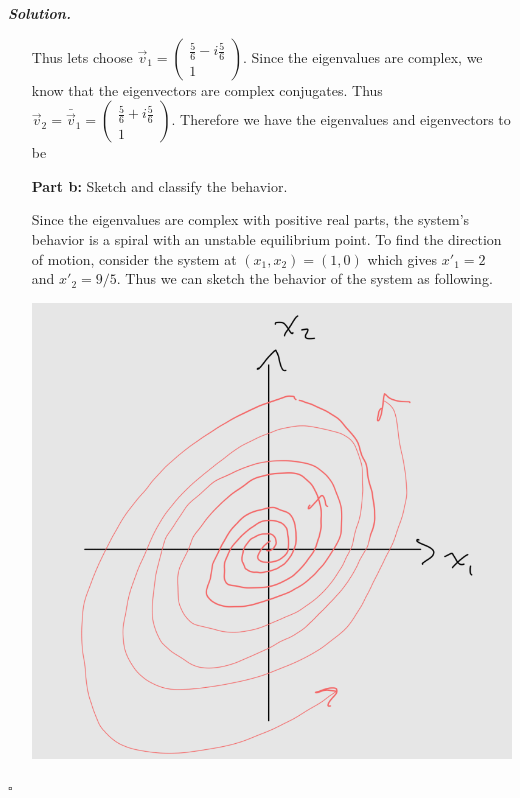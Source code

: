 \documentclass[12pt]{report}
\newenvironment{solution}[1][\it{Solution}]{\textbf{#1. } }{$\square$}
\newcommand*\widefbox[1]{\fbox{#1}}
\begin{document}
\begin{solution}
\begin{enumerate}
        Thus lets choose $\vec{v}_1 = \begin{pmatrix}
            \frac{5}{6} - i \frac{5}{6}\\
            1
        \end{pmatrix}$. Since the eigenvalues are complex, we know that the eigenvectors are complex conjugates. Thus $\vec{v}_2 = \bar{\vec{v}}_1 = \begin{pmatrix}
            \frac{5}{6} + i \frac{5}{6}\\
            1
        \end{pmatrix}$. Therefore we have the eigenvalues and eigenvectors to be

        \item [{\bf Part b:}] Sketch and classify the behavior.
        
        \noindent
        Since the eigenvalues are complex with positive real parts, the system's behavior is a spiral with an unstable equilibrium point. To find the direction of motion, consider the system at $(x_1,x_2) = (1,0)$ which gives $x'_1 = 2$ and $x'_2 = 9/5$. Thus we can sketch the behavior of the system as following. 

        \begin{center}
        \includegraphics[width=.6\linewidth]{images/4.PNG}
        \end{center}
    \end{enumerate}
\end{solution}
\newpage
\end{document}
